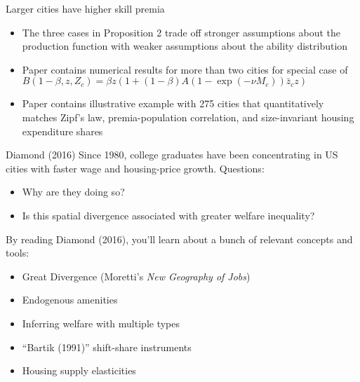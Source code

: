 \documentclass[11pt,notes=hide,aspectratio=169]{beamer}
\begin{document}
\begin{frame}{Larger cities have higher skill premia}
\begin{itemize}
	\item The three cases in Proposition 2 trade off stronger assumptions about the production function with weaker assumptions about the ability distribution
	\item Paper contains numerical results for more than two cities for special case of
	$B(1-\beta,z,Z_c) = {\beta}z(1+(1-\beta)A\left(1-\exp(-\nu M_c) \right) \bar{z}_{c} z)$
	\item Paper contains illustrative example with 275 cities that quantitatively matches Zipf's law, premia-population correlation, and size-invariant housing expenditure shares
\end{itemize}
\end{frame}
\begin{frame}{Diamond (2016)}
Since 1980, college graduates have been concentrating in US cities with faster wage and housing-price growth. Questions:
\begin{itemize}
	\item Why are they doing so?
	\item Is this spatial divergence associated with greater welfare inequality?
\end{itemize}
By reading Diamond (2016), you'll learn about a bunch of relevant concepts and tools:
\begin{itemize}
	\item Great Divergence (Moretti's \textit{New Geography of Jobs})
	\item Endogenous amenities
	\item Inferring welfare with multiple types
	\item ``Bartik (1991)'' shift-share instruments
	\item Housing supply elasticities
\end{itemize}
\end{frame}
\end{document}
